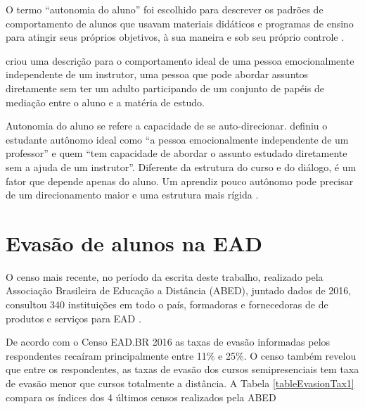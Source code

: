 O termo ``autonomia do aluno'' foi escolhido para descrever os padrões de
comportamento de alunos que usavam materiais didáticos e programas de ensino
para atingir seus próprios objetivos, à sua maneira e sob seu próprio controle
\cite{moore2008teoria}.

 criou uma descrição para o
comportamento ideal de uma pessoa emocionalmente independente de um instrutor,
uma pessoa que pode abordar assuntos diretamente sem ter um adulto participando
de um conjunto de papéis de mediação entre o aluno e a matéria de estudo.

Autonomia do aluno  se refere a capacidade de se auto-direcionar.
 definiu o estudante autônomo ideal como ``a
pessoa emocionalmente independente de um professor'' e quem ``tem capacidade de
abordar o assunto estudado diretamente sem a ajuda de um instrutor''. Diferente
da estrutura do curso e do diálogo, é um fator que depende apenas do aluno. Um
aprendiz pouco autônomo pode precisar de um direcionamento maior e uma estrutura
mais rígida \cite{huang2016understanding}.

\section{Evasão de alunos na EAD}

O censo mais recente, no período da escrita deste trabalho, realizado pela
Associação Brasileira de Educação a Distância (ABED), juntado dados de 2016,
consultou 340 instituições em todo o país, formadoras e fornecedoras de de
produtos e serviços para EAD \cite{abed2016ead}.

De acordo com o Censo EAD.BR 2016 as taxas de evasão informadas pelos
respondentes recaíram principalmente entre 11\% e 25\%. O censo também revelou
que entre os respondentes, as taxas de evasão dos cursos semipresenciais tem
taxa de evasão menor que cursos totalmente a distância. A Tabela
\ref{tableEvasionTax1} compara os índices dos 4 últimos censos realizados pela
ABED
\cite{abed2013ead,abed2014ead,abed2015ead,abed2016ead}

